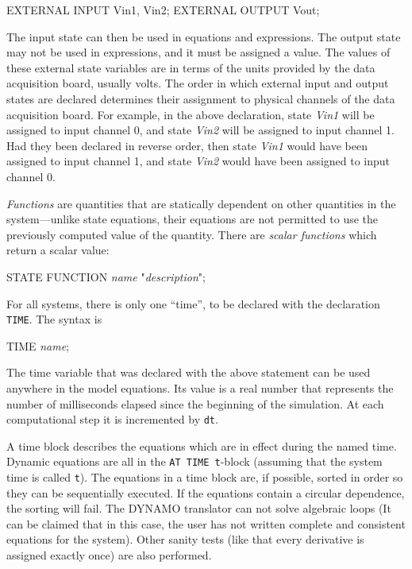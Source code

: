 \begin{example}
        EXTERNAL INPUT Vin1, Vin2;
        EXTERNAL OUTPUT Vout;
\end{example}

The input state can then be used in equations and expressions. The output state may not be used in expressions, and it must be assigned a value.  The values of these external state variables are in terms of the units provided by the data acquisition board, usually volts. The order in which external input and output states are declared determines their assignment to physical channels of the data acquisition board.  For example, in the above declaration, state \emph{Vin1} will be assigned to input channel 0, and state \emph{Vin2} will be assigned to input channel 1. Had they been declared in reverse order, then state \emph{Vin1} would have been assigned to input channel 1, and state \emph{Vin2} would have been assigned to input channel 0.

\emph{Functions} are quantities that are statically dependent on other quantities in the system---unlike state equations, their equations are not permitted to use the previously computed value of the quantity. There are \emph{scalar functions} which return a scalar value:
\begin{example}
        STATE FUNCTION \emph{name} "\emph{description}";
\end{example}

For all systems, there is only one ``time'', to be declared with the declaration \texttt{TIME}. The syntax is

\begin{example}
        TIME \emph{name};
\end{example}

The time variable that was declared with the above statement can be used anywhere in the model equations. Its value is a real number that represents the number of milliseconds elapsed since the beginning of the simulation. At each computational step it is incremented by \texttt{dt}.

A time block describes the equations which are in effect during the named time. Dynamic equations are all in the \texttt{AT TIME t}-block (assuming that the system time is called \texttt{t}).  The equations in a time block are, if possible, sorted in order so they can be sequentially executed. If the equations contain a circular dependence, the sorting will fail. The DYNAMO translator can not solve algebraic loops (It can be claimed that in this case, the user has not written complete and consistent equations for the system). Other sanity tests (like that every derivative is assigned exactly once) are also performed.

